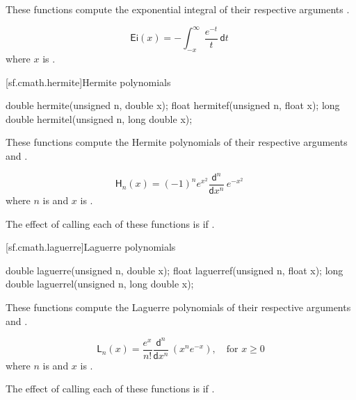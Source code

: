 \begin{itemdescr}

\pnum\effects
These functions compute the exponential integral
of their respective arguments
.

\pnum\returns
\[%
  \mathsf{Ei}(x) =
  - \int_{-x}^\infty \frac{e^{-t}}
                          {t     } \, \mathsf{d}t
\;
\]
where
$x$ is .

\end{itemdescr}

[sf.cmath.hermite]{Hermite polynomials}%
%
%
%
%
%
\begin{itemdecl}
double       hermite(unsigned n, double x);
float        hermitef(unsigned n, float x);
long double  hermitel(unsigned n, long double x);
\end{itemdecl}

\begin{itemdescr}
\pnum\effects
These functions compute the Hermite polynomials
of their respective arguments
 and .

\pnum\returns
\[%
  \mathsf{H}_n(x) =
  (-1)^n e^{x^2} \frac{ \mathsf{d} ^n}
		      { \mathsf{d}x^n} \, e^{-x^2}
\;
\]
where
$n$ is  and
$x$ is .

\pnum\remarks
The effect of calling each of these functions
is 
if .
\end{itemdescr}

[sf.cmath.laguerre]{Laguerre polynomials}%
%
%
%
%
%
\begin{itemdecl}
double       laguerre(unsigned n, double x);
float        laguerref(unsigned n, float x);
long double  laguerrel(unsigned n, long double x);
\end{itemdecl}

\begin{itemdescr}

\pnum\effects
These functions compute the Laguerre polynomials
of their respective arguments
 and .

\pnum\returns
\[%
  \mathsf{L}_n(x) =
  \frac{e^x}{n!} \frac{ \mathsf{d} ^ n}
		    { \mathsf{d}x ^ n} \, (x^n e^{-x}),
	   \quad \mbox{for $x \ge 0$}
\]
where
$n$ is  and
$x$ is .

\pnum\remarks
The effect of calling each of these functions
is 
if .
\end{itemdescr}

